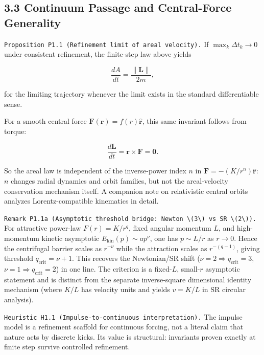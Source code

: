 \documentclass[
]{article}
\begin{document}
\subsection{3.3 Continuum Passage and Central-Force
Generality}\label{continuum-passage-and-central-force-generality}

\texttt{Proposition\ P1.1\ (Refinement\ limit\ of\ areal\ velocity).} If
\(\max_k \Delta t_k\to 0\) under consistent refinement, the finite-step
law above yields

\[
\frac{dA}{dt}=\frac{\|\mathbf L\|}{2m},
\]

for the limiting trajectory whenever the limit exists in the standard
differentiable sense.

For a smooth central force \(\mathbf F(\mathbf r)=f(r)\hat{\mathbf r}\),
this same invariant follows from torque:

\[
\frac{d\mathbf L}{dt}=\mathbf r\times \mathbf F=\mathbf 0.
\]

So the areal law is independent of the inverse-power index \(n\) in
\(\mathbf F=-(K/r^n)\hat{\mathbf r}\): \(n\) changes radial dynamics and
orbit families, but not the areal-velocity conservation mechanism
itself. A companion note on relativistic central orbits analyzes
Lorentz-compatible kinematics in detail.

\texttt{Remark\ P1.1a\ (Asymptotic\ threshold\ bridge:\ Newton\ \textbackslash{}(3\textbackslash{})\ vs\ SR\ \textbackslash{}(2\textbackslash{})).}
For attractive power-law \(F(r)=K/r^q\), fixed angular momentum \(L\),
and high-momentum kinetic asymptotic
\(E_{\mathrm{kin}}(p)\sim a p^\nu\), one has \(p\sim L/r\) as \(r\to0\).
Hence the centrifugal barrier scales as \(r^{-\nu}\) while the
attraction scales as \(r^{-(q-1)}\), giving threshold
\(q_{\mathrm{crit}}=\nu+1\). This recovers the Newtonian/SR shift
(\(\nu=2\Rightarrow q_{\mathrm{crit}}=3\),
\(\nu=1\Rightarrow q_{\mathrm{crit}}=2\)) in one line. The criterion is
a fixed-\(L\), small-\(r\) asymptotic statement and is distinct from the
separate inverse-square dimensional identity mechanism (where \(K/L\)
has velocity units and yields \(v=K/L\) in SR circular analysis).

\texttt{Heuristic\ H1.1\ (Impulse-to-continuous\ interpretation).} The
impulse model is a refinement scaffold for continuous forcing, not a
literal claim that nature acts by discrete kicks. Its value is
structural: invariants proven exactly at finite step survive controlled
refinement.
\end{document}
